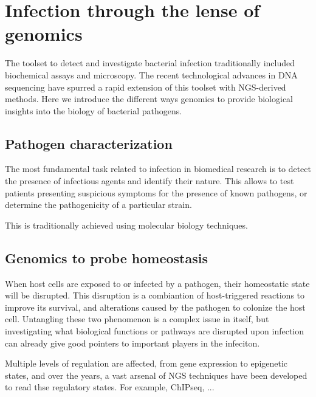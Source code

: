 
\chapter{Infection through the lense of genomics} %

\label{ch:01-02} %


The toolset to detect and investigate bacterial infection traditionally included biochemical assays and microscopy. The recent technological advances in DNA sequencing have spurred a rapid extension of this toolset with NGS-derived methods. Here we introduce the different ways genomics to provide biological insights into the biology of bacterial pathogens.

\section{Pathogen characterization}

The most fundamental task related to infection in biomedical research is to detect the presence of infectious agents and identify their nature. This allows to test patients presenting suspicious symptoms for the presence of known pathogens, or determine the pathogenicity of a particular strain. 

This is traditionally achieved using molecular biology techniques.

\section{Genomics to probe homeostasis}

When host cells are exposed to or infected by a pathogen, their homeostatic state will be disrupted. This disruption is a combiantion of host-triggered reactions to improve its survival, and alterations caused by the pathogen to colonize the host cell. Untangling these two phenomenon is a complex issue in itself, but investigating what biological functions or pathways are disrupted upon infection can already give good  pointers to important players in the infeciton.

Multiple levels of regulation are affected, from gene expression to epigenetic states, and over the years, a vast arsenal of NGS techniques have been developed to read thse regulatory states. For example, ChIPseq, ...


